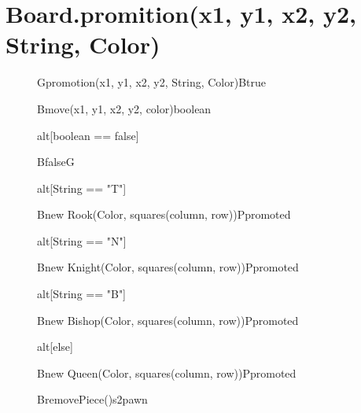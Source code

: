 \documentclass[8pt]{article}
\begin{document}
\section{Board.promition(x1, y1, x2, y2, String, Color)}
\begin{figure}[H]
	\centering
  	\begin{adjustbox}{width=\textwidth, height=\textheight}
		\begin{sequencediagram}
			
			\begin{call}{G}{promotion(x1, y1, x2, y2, String, Color)}{B}{true}	
				\begin{callself}{B}{move(x1, y1, x2, y2, color)}{boolean}
				\end{callself}
				\begin{sdblock}{alt}{[boolean == false]}
				    \begin{messcall}{B}{false}{G}
					\end{messcall} 	
				\end{sdblock}
				
				\begin{sdblock}{alt}{[String == "T"]}
				    \begin{call}{B}{new Rook(Color, squares(column, row))}{P}{promoted}
					\end{call}
				\end{sdblock}
				\begin{sdblock}{alt}{[String == "N"]}
				    \begin{call}{B}{new Knight(Color, squares(column, row))}{P}{promoted}
					\end{call}
				\end{sdblock}
				\begin{sdblock}{alt}{[String == "B"]}
				    \begin{call}{B}{new Bishop(Color, squares(column, row))}{P}{promoted}
					\end{call}
				\end{sdblock}
				\begin{sdblock}{alt}{[else]}
				    \begin{call}{B}{new Queen(Color, squares(column, row))}{P}{promoted}
					\end{call}
				\end{sdblock}
			
			    \begin{call}{B}{removePiece()}{s2}{pawn}
				\end{call}
				

\end{call}
\end{sequencediagram}
\end{adjustbox}
\end{figure}
\end{document}
